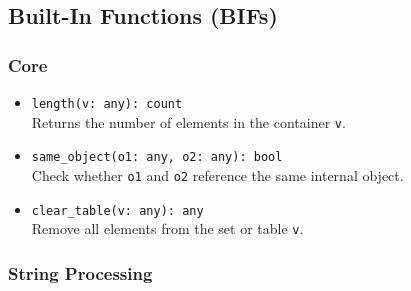 \documentclass[10pt,landscape]{article}
\begin{document}
\begin{multicols*}{2}
\subsection*{Built-In Functions (BIFs)}
\linespread{0.9}

\subsubsection*{Core}

\begin{itemize}
  \item \verb|length(v: any): count|\\
    Returns the number of elements in the container \texttt{v}.
  \item \verb|same_object(o1: any, o2: any): bool|\\
    Check whether \texttt{o1} and \texttt{o2} reference the same internal
    object.
  \item \verb|clear_table(v: any): any|\\
    Remove all elements from the set or table \texttt{v}.
\end{itemize}

\subsubsection*{String Processing}


\end{multicols*}
\end{document}
